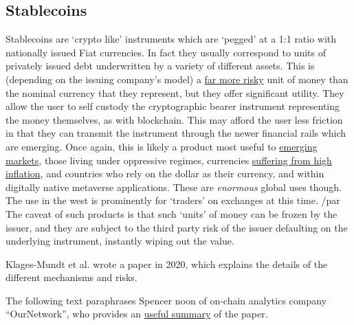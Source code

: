\subsection{Stablecoins}
Stablecoins are `crypto like' instruments which are `pegged' at a 1:1 ratio with nationally issued Fiat currencies. In fact they usually correspond to units of privately issued  debt underwritten by a variety of different assets. This is (depending on the issuing company's model) a \href{https://www.americanbanker.com/opinion/ststablecoins-are-backed-by-reserves-give-us-a-break}{far more risky} unit of money than the nominal currency that they represent, but they offer significant utility. They allow the user to self custody the cryptographic bearer instrument representing the money themselves, as with blockchain. This may afford the user less friction in that they can transmit the instrument through the newer financial rails which are emerging. Once again, this is likely a product most useful to \href{https://www.cigionline.org/articles/the-future-of-fintech-is-unfolding-in-africa/?}{emerging markets}, those living under oppressive regimes, currencies \href{https://www.bloomberg.com/news/articles/2022-07-03/argentines-seek-hedging-in-crypto-after-economy-minister-resigns}{suffering from high inflation}, and countries who rely on the dollar as their currency, and within digitally native metaverse applications. These are \textit{enormous} global uses though. The use in the west is prominently for `traders' on exchanges at this time. /par
The caveat of such products is that such `units' of money can be frozen by the issuer, and they are subject to the third party risk of the issuer defaulting on the underlying instrument, instantly wiping out the value.\par
Klages-Mundt et al. wrote a paper in 2020, which explains the details of the different mechanisms and risks.\par
The following text paraphrases Spencer noon of on-chain analytics company ``OurNetwork'', who provides an \href{https://twitter.com/spencernoon/status/1524752048121466883}{useful summary} of the paper.
